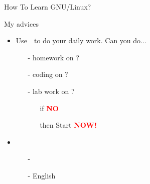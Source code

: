 \begin{frame}{How To Learn GNU/Linux?}
  \begin{block}{My advices}
    \begin{itemize}
    \item Use \,{\linux}\, to do your daily work. Can you do...
      \begin{itemize}
      \item[-] homework on \linux?
      \item[-] coding on \linux?
      \item[-] lab work on \linux?
        \begin{itemize}
        \item[if] \textbf{\textcolor{Red}{\purisa NO}}
        \item[then] Start \textbf{\textcolor{Red}{\purisa NOW!}}
        \end{itemize}
      \end{itemize}
    \item {\nerd } \world
      \begin{itemize}
      \item[-] \google
      \item[-] {\purisa English}
      \end{itemize}
    \end{itemize}
  \end{block}
\end{frame}

